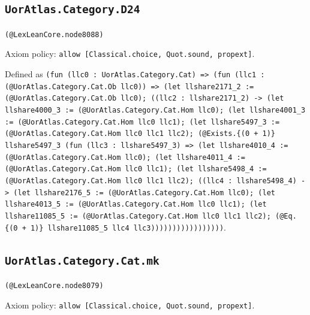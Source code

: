 \documentclass[11pt]{article}
\begin{document}
\subsection*{\texttt{UorAtlas.Category.D24}}
\noindent\texttt{(@LexLeanCore.node8088)}\par
\noindent Axiom policy: \texttt{allow [Classical.choice, Quot.sound, propext]}.\par
\noindent Defined as \texttt{(fun (llc0 : UorAtlas.Category.Cat) => (fun (llc1 : (@UorAtlas.Category.Cat.Ob llc0)) => (let llshare2171\_2 := (@UorAtlas.Category.Cat.Ob llc0); ((llc2 : llshare2171\_2) -> (let llshare4000\_3 := (@UorAtlas.Category.Cat.Hom llc0); (let llshare4001\_3 := (@UorAtlas.Category.Cat.Hom llc0 llc1); (let llshare5497\_3 := (@UorAtlas.Category.Cat.Hom llc0 llc1 llc2); (@Exists.\{(0 + 1)\} llshare5497\_3 (fun (llc3 : llshare5497\_3) => (let llshare4010\_4 := (@UorAtlas.Category.Cat.Hom llc0); (let llshare4011\_4 := (@UorAtlas.Category.Cat.Hom llc0 llc1); (let llshare5498\_4 := (@UorAtlas.Category.Cat.Hom llc0 llc1 llc2); ((llc4 : llshare5498\_4) -> (let llshare2176\_5 := (@UorAtlas.Category.Cat.Hom llc0); (let llshare4013\_5 := (@UorAtlas.Category.Cat.Hom llc0 llc1); (let llshare11085\_5 := (@UorAtlas.Category.Cat.Hom llc0 llc1 llc2); (@Eq.\{(0 + 1)\} llshare11085\_5 llc4 llc3)))))))))))))))))}.\par
\subsection*{\texttt{UorAtlas.Category.Cat.mk}}
\noindent\texttt{(@LexLeanCore.node8079)}\par
\noindent Axiom policy: \texttt{allow [Classical.choice, Quot.sound, propext]}.\par
\end{document}
